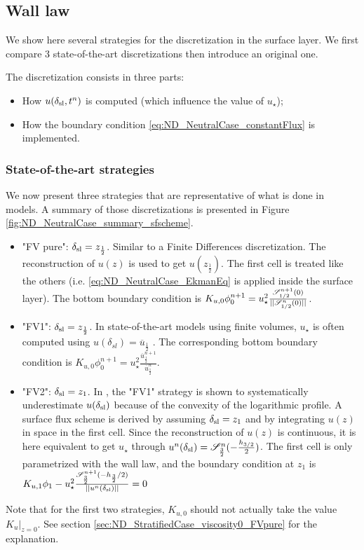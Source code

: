 \subsection{Wall law}
We show here several strategies for the discretization
in the surface layer. We first compare 3 state-of-the-art
discretizations then introduce an original one.

The discretization consists in three parts:
\begin{itemize}
	\item How $u(\delta_{\rm sl}, t^n)$ is computed
		(which influence the value of $u_\star$);
	\item How the boundary condition 
		\eqref{eq:ND_NeutralCase_constantFlux} is implemented.
\end{itemize}
\subsubsection{State-of-the-art strategies}
  We now present three strategies that are representative of
  what is done in models. A summary of those discretizations
  is presented in Figure \ref{fig:ND_NeutralCase_summary_sfscheme}.
  \begin{itemize}
	  \item "FV pure": $\delta_{\rm sl} = z_{\frac{1}{2}}$. Similar to a Finite Differences discretization.
	    The reconstruction of $u(z)$ is used to get 
		  $u(z_{\frac{1}{2}})$.
		  The first cell is treated like the others
		  (i.e. \eqref{eq:ND_NeutralCase_EkmanEq} is
		  applied inside the surface layer).
	The bottom boundary condition is 
		  $ K_{u,0} \phi_0^{n+1} = u_\star^2 
		  \frac{{\cal S}_{1/2}^{n+1}(0)}{||{\cal S}_{1/2}^n(0)||}$.
	  \item "FV1": $\delta_{\rm sl} = z_{\frac{1}{2}}$.
		  In state-of-the-art models using finite volumes,
		  $u_{\star}$ is often computed using
		  $u(\delta_{sl}) = \overline{u}_{\frac{1}{2}}$
		\cite{nishizawa2018surface}.
		The corresponding bottom boundary condition is
		$ K_{u,0} \phi_0^{n+1} = u_\star^2 
		  \frac{\overline{u}^{n+1}_{\frac{1}{2}}}
		  	{\overline{u}_{\frac{1}{2}}^n}$.

    \item "FV2":  $\delta_{\rm sl} = z_{1}$. In
    \cite{nishizawa2018surface}, the "FV1" strategy is shown to systematically
	  underestimate $u(\delta_{\rm sl})$ because of the 
	  convexity of the logarithmic profile.
	A surface flux scheme is derived by assuming
	  $\delta_{\rm sl} = z_1$ and by integrating $u(z)$
	  in space in the first cell. Since the reconstruction
	  of $u(z)$ is continuous, it is here equivalent to
	  get $u_\star$ through
	  $u^n(\delta_{\rm sl}) = {\cal S}^n_{\frac{3}{2}}(
	  -\frac{h_{3/2}}{2})$. The first cell is only
	  parametrized with the wall law, and the boundary condition
		  at $z_1$ is $K_{u,1} \phi_1 - u_\star^2 
		  \frac{{\cal S}_{\frac{3}{2}}^{n+1}
		  	(-h_{\frac{3}{2}}/2)}
		  {||u^n(\delta_{\rm sl})||} = 0$
	  
  \end{itemize}
  Note that for the first two strategies, $K_{u,0}$
  should not actually
  take the value $\left. K_{u}\right|_{z=0}$.
  See section \ref{sec:ND_StratifiedCase_viscosity0_FVpure} for
  the explanation.

